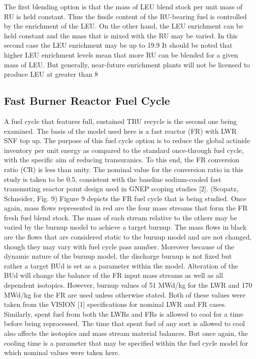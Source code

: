 The first blending option is that the mass of LEU blend stock per unit mass of RU is held constant.  Thus the fissile content of the RU-bearing fuel is controlled by the enrichment of the LEU.  On the other hand, the LEU enrichment can be held constant and the mass that is mixed with the RU may be varied.  In this second case the LEU enrichment may be up to 19.9%
It should be noted that higher LEU enrichment levels mean that more RU can be blended for a given mass of LEU.  But generally, near-future enrichment plants will not be licensed to produce LEU at greater than 8%



\subsection{Fast Burner Reactor Fuel Cycle}
\label{1g_sec:}
A fuel cycle that features full, sustained TRU recycle is the second one being examined.  The basis of the model used here is a fast reactor (FR) with LWR SNF top up.  The purpose of this fuel cycle option is to reduce the global actinide inventory per unit energy as compared to the standard once-through fuel cycle, with the specific aim of reducing transuranics.   To this end, the FR conversion ratio (CR) is less than unity.  The nominal value for the conversion ratio in this study is taken to be 0.5, consistent with the baseline sodium-cooled fast transmuting reactor point design used in GNEP scoping studies [2].  
(Scopatz, Schneider, Fig. 9)
Figure 9 depicts the FR fuel cycle that is being studied.  Once again, mass flows represented in red are the four mass streams that form the FR fresh fuel blend stock.  The mass of each stream relative to the others may be varied by the burnup model to achieve a target burnup.  The mass flows in black are the flows that are considered static to the burnup model and are not changed, though they may vary with fuel cycle pass number.  
Moreover because of the dynamic nature of the burnup model, the discharge burnup is not fixed but rather a target BUd is set as a parameter within the model.  Alteration of the BUd will change the balance of the FR input mass streams as well as all dependent isotopics.  However, burnup values of 51 MWd/kg for the LWR and 170 MWd/kg for the FR are used unless otherwise stated.  Both of these values were taken from the VISION [1] specifications for nominal LWR and FR cases.  Similarly, spent fuel from both the LWRs and FRs is allowed to cool for a time before being reprocessed.  The time that spent fuel of any sort is allowed to cool also affects the isotopics and mass stream material balances.  But once again, the cooling time is a parameter that may be specified within the fuel cycle model for which nominal values were taken here.
